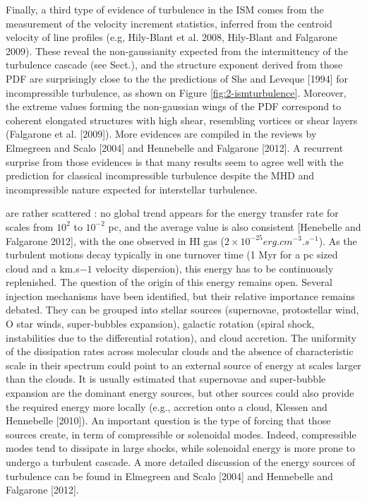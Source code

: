 Finally, a third type of evidence of turbulence in the ISM comes from the
measurement of the velocity increment statistics, inferred from the centroid
velocity of line profiles (e.g, Hily-Blant et al. 2008, Hily-Blant and Falgarone 2009). These reveal the non-gaussianity expected from the intermittency of
the turbulence cascade (see Sect.), and the structure exponent derived
from those PDF are surprisingly close to the the predictions of She and Leveque [1994] for incompressible turbulence, as shown on Figure \ref{fig:2-ismturbulence}. Moreover,
the extreme values forming the non-gaussian wings of the PDF correspond to coherent elongated structures with high shear, resembling vortices or shear
layers (Falgarone et al. [2009]).
More evidences are compiled in the reviews by Elmegreen and Scalo [2004]
and Hennebelle and Falgarone [2012]. A recurrent surprise from those evidences is that many results seem to agree well with the prediction for classical incompressible turbulence despite the MHD and incompressible nature expected for interstellar turbulence.

 are rather scattered : no global trend appears for the energy transfer rate for scales from $10^2$ to $10^{-2}$ pc, and the average value is also consistent [Henebelle and Falgarone 2012], with the one observed in HI gas ($ 2 \times 10^{-25} erg.cm^{-3 }.s ^{-1 }$). As the turbulent motions decay typically in one turnover time (1 Myr for a pc sized cloud and a km.s${-1}$ velocity dispersion), this energy has to be continuously replenished. The question of the origin of this energy remains
open. Several injection mechanisms have been identified, but their relative
importance remains debated.
They can be grouped into stellar sources (supernovae, protostellar wind, O
star winds, super-bubbles expansion), galactic rotation (spiral shock, instabilities due to the differential rotation), and cloud accretion. The uniformity of
the dissipation rates across molecular clouds and the absence of characteristic
scale in their spectrum could point to an external source of energy at scales
larger than the clouds.
It is usually estimated that supernovae and super-bubble expansion are the
dominant energy sources, but other sources could also provide the required
energy more locally (e.g., accretion onto a cloud, Klessen and Hennebelle
[2010]).
An important question is the type of forcing that those sources create, in
term of compressible or solenoidal modes. Indeed, compressible modes tend
to dissipate in large shocks, while solenoidal energy is more prone to undergo
a turbulent cascade.
A more detailed discussion of the energy sources of turbulence can be
found in Elmegreen and Scalo [2004] and Hennebelle and Falgarone [2012].

